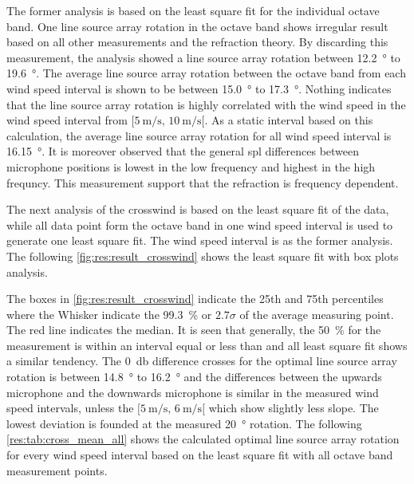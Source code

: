 The former analysis is based on the least square fit for the individual octave band. One line source array rotation in the  octave band shows irregular result based on all other measurements and the refraction theory. By discarding this measurement, the analysis showed a line source array rotation between  \SI{12.2}{\degree} to  \SI{19.6}{\degree}. The average line source array rotation between the octave band from each wind speed interval is shown to be between \SI{15.0}{\degree} to \SI{17.3}{\degree}. Nothing indicates that the line source array rotation is highly correlated with the wind speed in the  wind speed interval from $[\SI{5}{\meter\per\second},\, \SI{10}{\meter\per\second}[ $. As a static interval based on this calculation, the average line source array rotation for all wind speed interval is \SI{16.15}{\degree}. It is moreover observed that the general \gls{spl} differences between microphone positions is lowest in the low frequency and highest in the high frequncy. This measurement support that the refraction is frequency dependent.

The next analysis of the crosswind is based on the least square fit of the data, while all data point form the octave band in one wind speed interval is used to generate one least square fit. The wind speed interval is as the former analysis. The following \autoref{fig:res:result_crosswind} shows the least square fit with box plots analysis. 
 
 
 

 

The boxes in \autoref{fig:res:result_crosswind} indicate the 25th and 75th percentiles where the Whisker indicate the \SI{99.3}{\percent} or $2.7\sigma$ of the average measuring point. The red line indicates the median. It is seen that generally, the \SI{50}{\percent} for the measurement is within an interval equal or less than  and all least square fit shows a similar tendency. The \SI{0}{\decibel} difference crosses for the optimal line source array rotation is between \SI{14.8}{\degree} to \SI{16.2}{\degree} and the differences between the upwards microphone and the downwards microphone is similar in the measured wind speed intervals, unless the $[\SI{5}{\meter\per\second},\, \SI{6}{\meter\per\second}[ $ which show slightly less slope. The lowest deviation is founded at the measured \SI{20}{\degree} rotation. The following \autoref{res:tab:cross_mean_all} shows the calculated optimal line source array rotation for every wind speed interval based on the least square fit with all octave band measurement points.
 
